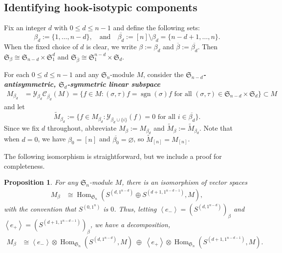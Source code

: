 \documentclass[11pt, noadjust, reqno]{amsart}
\newtheorem{proposition}[theorem]{Proposition}
\theoremstyle{definition}
\theoremstyle{remark}
\numberwithin{equation}{section}
\newcommand{\0}{\emptyset}
\renewcommand{\S}{\mathfrak{S}}
\newcommand{\cC}{\mathcal{C}}
\newcommand{\cY}{\mathcal{Y}}
\DeclareMathOperator{\sgn}{sgn}
\DeclareMathOperator{\Hom}{Hom}
\newcommand{\newword}[1]{\emph{\textbf{#1}}}
\begin{document}
\subsection{Identifying hook-isotypic components}
\label{subsec:identifyhook}
Fix an integer $d$ with $0 \leq d \leq n-1$ and define the following sets: 
\begin{equation*}
   \beta_d := \{1,\ldots,n-d\}, \quad \text{and} \quad \overline{\beta_d} := [n]\setminus \beta_d=\{n-d+1,\ldots,n\}.
\end{equation*}
When the fixed choice of $d$ is clear, we write $\beta := \beta_d$ and $\overline{\beta} := \overline{\beta_d}$.
Then $\S_\beta \cong \S_{n-d} \times \S_1^{ d}$ and $\S_{\overline{\beta}} \cong \S_1^{n-d} \times \S_d$.

For each $0 \leq d \leq n-1$ and any $\mathfrak{S}_n$-module $M$,
consider the
\newword{$\S_{n-d}$-antisymmetric, $\S_d$-symmetric linear subspace}
\begin{align*}
M_{\beta_d}&= \cY_{\beta_d} \cC_{\overline{\beta_d}}(M)
= 
\{ f \in M : (\sigma,\tau)f = \sgn(\sigma) f \text{ for all } (\sigma,\tau) \in \S_{n-d} \times \S_d\} 
\subset M \end{align*}
and let 
\[
\widetilde{M}_{\beta_d} := \{ f \in M_{\beta_d} : \cY_{\beta_d \cup \{i\}}(f) =0 \text{ for all } i \in \overline{\beta_d}\}.
\]
Since we fix $d$ throughout, abbreviate $M_\beta := M_{\beta_d}$ and $\widetilde{M}_\beta := \widetilde{M}_{\beta_d}$.
Note that when $d=0$, we have $\beta_0 = [n]$ and $\overline{\beta_0} = \varnothing$, so $\widetilde{M}_{[n]} = M_{[n]}$.

The following isomorphism is straightforward, but we include a proof for completeness.

\begin{proposition}\label{prop:hook-hom-iso}
    For any $\mathfrak{S}_n$-module $M$, there is an isomorphism of vector spaces
    \begin{align*}
M_\beta &\cong \Hom_{\mathfrak{S}_n} (S^{(d,1^{n-d})} \oplus S^{(d+1,1^{n-d-1})}, M),
    \end{align*}
    with the convention that $S^{(0,1^n)}$ is $0$.
Thus, letting $\left\langle e_- \right\rangle = (S^{(d,1^{n-d})})_\beta$ and $\left\langle e_+ \right\rangle = (S^{(d+1,1^{n-d-1})})_\beta$, we have a decomposition, 
\begin{align*}
M_\beta 
&\cong \left\langle e_- \right\rangle  \otimes \Hom_{\S_n}( S^{(d,1^{n-d})}, M) \; \oplus \; \left\langle e_+ \right\rangle  \otimes \Hom_{\S_n}( S^{(d+1,1^{n-d-1})}, M).
    \end{align*}
\end{proposition}
\end{document}
